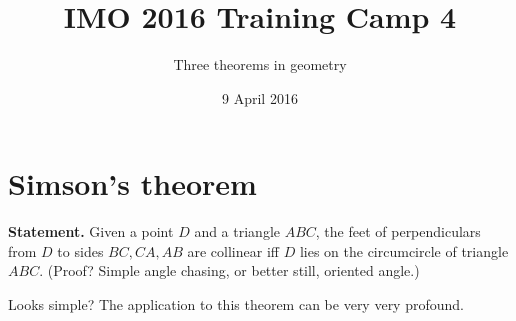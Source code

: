 \documentclass[11pt,a4paper]{article}
\begin{document}
\title{IMO 2016 Training Camp 4}
\author{Three theorems in geometry}
\date{9 April 2016}
\maketitle

\section {Simson's theorem}

\textbf {Statement.} Given a point $D$ and a triangle $ABC$, the feet of perpendiculars from $D$ to sides $BC, CA, AB$ are collinear iff $D$ lies on the circumcircle of triangle $ABC$. (Proof? Simple angle chasing, or better still, oriented angle.)

Looks simple? The application to this theorem can be very very profound.
\end{document}
